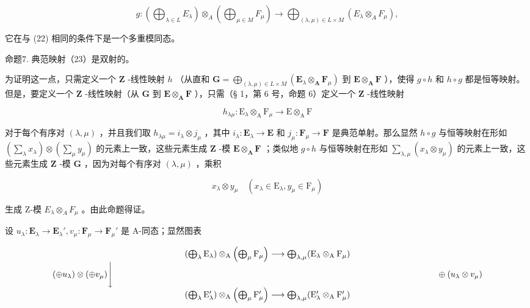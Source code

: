 \[
g: \left(\bigoplus_ {\lambda \in L} E _ {\lambda}\right) \otimes_ {A} \left(\bigoplus_ {\mu \in M} F _ {\mu}\right)\rightarrow \bigoplus_ {(\lambda , \mu) \in L \times M} (E _ {\lambda} \otimes_ {A} F _ {\mu}),\tag{23}
\]

它在与 (22) 相同的条件下是一个多重模同态。

命题7. 典范映射（23）是双射的。

为证明这一点，只需定义一个 \(\mathbf{Z}\) -线性映射 \(h\) （从直和 \(\mathbf{G} = \bigoplus_{(\lambda, \mu) \in L \times M} (\mathbf{E}_{\lambda} \otimes_{\mathbf{A}} \mathbf{F}_{\mu})\) 到 \(\mathbf{E} \otimes_{\mathbf{A}} \mathbf{F}\) ），使得 \(g \circ h\) 和 \(h \circ g\) 都是恒等映射。但是，要定义一个 \(\mathbf{Z}\) -线性映射（从 \(\mathbf{G}\) 到 \(\mathbf{E} \otimes_{\mathbf{A}} \mathbf{F}\) ），只需（§ 1，第 6 号，命题 6）定义一个 \(\mathbf{Z}\) -线性映射

\[
h _ {\lambda \mu}: \mathrm{E} _ {\lambda} \otimes_ {\mathrm{A}} \mathrm{F} _ {\mu} \rightarrow \mathrm{E} \otimes_ {\mathrm{A}} \mathrm{F}
\]

对于每个有序对 \((\lambda, \mu)\) ，并且我们取 \(h_{\lambda \mu} = i_{\lambda} \otimes j_{\mu}\) ，其中 \(i_{\lambda}: \mathbf{E}_{\lambda} \to \mathbf{E}\) 和 \(j_{\mu}: \mathbf{F}_{\mu} \to \mathbf{F}\) 是典范单射。那么显然 \(h \circ g\) 与恒等映射在形如 \(\left(\sum_{\lambda} x_{\lambda}\right) \otimes \left(\sum_{\mu} y_{\mu}\right)\) 的元素上一致，这些元素生成 \(\mathbf{Z}\) -模 \(\mathbf{E} \otimes_{\mathbf{A}} \mathbf{F}\) ；类似地 \(g \circ h\) 与恒等映射在形如 \(\sum_{\lambda, \mu} (x_{\lambda} \otimes y_{\mu})\) 的元素上一致，这些元素生成 \(\mathbf{Z}\) -模 \(\mathbf{G}\) ，因为对每个有序对 \((\lambda, \mu)\) ，乘积

\[
x _ {\lambda} \otimes y _ {\mu} \quad (x _ {\lambda} \in \mathrm{E} _ {\lambda}, y _ {\mu} \in \mathrm{F} _ {\mu})
\]

生成 Z-模 \(E_{\lambda} \otimes_{A} F_{\mu}\) 。由此命题得证。

设 \(u_{\lambda}: \mathbf{E}_{\lambda} \to \mathbf{E}_{\lambda}', v_{\mu}: \mathbf{F}_{\mu} \to \mathbf{F}_{\mu}'\) 是 A-同态；显然图表

\[
\begin{array}{c} \left(\bigoplus_ {\lambda} \mathrm{E} _ {\lambda}\right) \otimes_ {\mathrm{A}} \left(\bigoplus_ {\mu} \mathrm{F} _ {\mu}\right) \longrightarrow \bigoplus_ {\lambda , \mu} (\mathrm{E} _ {\lambda} \otimes_ {\mathrm{A}} \mathrm{F} _ {\mu}) \\ (\oplus u _ {\lambda}) \otimes (\oplus v _ {\mu}) \Bigg \downarrow \qquad \qquad \qquad \qquad \qquad \qquad \qquad \qquad \qquad \qquad \qquad \qquad \qquad \qquad \qquad \qquad \qquad \qquad \qquad \oplus (u _ {\lambda} \otimes v _ {\mu}) \\ \left(\bigoplus_ {\lambda} \mathrm{E} _ {\lambda} ^ {\prime}\right) \otimes_ {\mathrm{A}} \left(\bigoplus_ {\mu} \mathrm{F} _ {\mu} ^ {\prime}\right) \longrightarrow \bigoplus_ {\lambda , \mu} (\mathrm{E} _ {\lambda} ^ {\prime} \otimes_ {\mathrm{A}} \mathrm{F} _ {\mu} ^ {\prime}) \end{array}
\]

